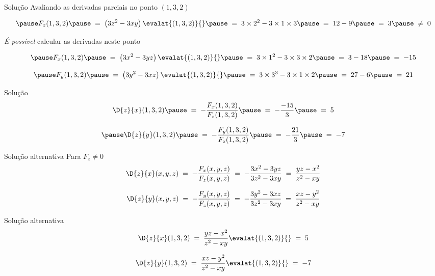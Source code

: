 \begin{resolution}{Solução}
  Avaliando as derivadas parciais no ponto \((1, 3, 2)\)

  \[
    \pause
    F_z(1, 3, 2)
    \pause
    \;=\; \left(3z^2 - 3xy\right)\evalat{(1, 3, 2)}{}
    \pause
    \;=\; 3\times 2^2 - 3 \times 1 \times 3
    \pause
    \;=\; 12 - 9
    \pause
    \;=\; 3
    \pause
    \;\neq\; 0
  \]

  \pause
  \emph{É possível} calcular as derivadas neste ponto

  \[
    \pause
    F_x(1, 3, 2)
    \pause
    \;=\; \left(3x^2 - 3yz\right)\evalat{(1, 3, 2)}{}
    \pause
    \;=\; 3 \times 1^2 - 3 \times 3 \times 2
    \pause
    \;=\; 3 - 18
    \pause
    \;=\; -15
  \]

  \[
    \pause
    F_y(1, 3, 2)
    \pause
    \;=\; \left(3y^2 - 3xz\right)\evalat{(1, 3, 2)}{}
    \pause
    \;=\; 3 \times 3^3 - 3 \times1 \times 2
    \pause
    \;=\; 27 - 6
    \pause
    \;=\; 21
  \]
\end{resolution}

\begin{resolution}{Solução}
  \[
    \D{z}{x}(1, 3, 2)
    \pause
    \;=\; -\frac{F_x(1, 3, 2)}{F_z(1, 3, 2)}
    \pause
    \;=\; -\frac{-15}{3}
    \pause
    \;=\; 5
  \]

  \[
    \pause
    \D{z}{y}(1, 3, 2)
    \pause
    \;=\; -\frac{F_y(1, 3, 2)}{F_z(1, 3, 2)}
    \pause
    \;=\; -\frac{21}{3}
    \pause
    \;=\; -7
  \]
\end{resolution}

\begin{resolution}{Solução alternativa}
  Para \(F_z \neq 0\)
  \pause
  \[
    \D{z}{x} (x, y, z)
    \;=\; -\frac{F_x(x, y, z)}{F_z(x, y, z)}
    \;=\; -\frac{3x^2 - 3yz}{3z^2 - 3xy}
    \;=\; \frac{yz - x^2}{z^2 - xy}
  \]

  \pause
  \[
    \D{z}{y} (x, y, z)
    \;=\; -\frac{F_y(x, y, z)}{F_z(x, y, z)}
    \;=\; -\frac{3y^2 - 3xz}{3z^2 - 3xy}
    \;=\; \frac{xz - y^2}{z^2 - xy}
  \]
\end{resolution}

\begin{resolution}{Solução alternativa}
  \[
    \D{z}{x} (1, 3, 2)
    \;=\; \frac{yz - x^2}{z^2 - xy} \evalat{(1, 3, 2)}{}
    \;=\; 5
  \]

  \pause
  \[
    \D{z}{y} (1, 3, 2)
    \;=\; \frac{xz - y^2}{z^2 - xy} \evalat{(1, 3, 2)}{}
    \;=\; -7
  \]
\end{resolution}

